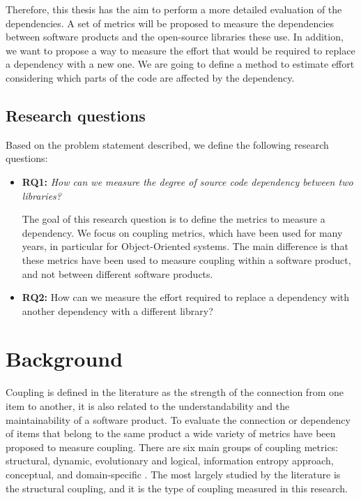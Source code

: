 \documentclass[a4paper]{article}
\begin{document}
Therefore, this thesis has the aim to perform a more detailed evaluation of the dependencies. A set of metrics will be proposed to measure the dependencies between software products and the open-source libraries these use. In addition, we want to propose a way to measure the effort that would be required to replace a dependency with a new one. We are going to define a method to estimate effort considering which parts of the code are affected by the dependency.

\subsection{Research questions}
Based on the problem statement described, we define the following research questions:

\begin{itemize}[noitemsep]
  \item \textbf{RQ1:} \textit{How can we measure the degree of source code dependency between two libraries?}

  The goal of this research question is to define the metrics to measure a dependency. We focus on coupling metrics, which have been used for many years, in particular for Object-Oriented systems. The main difference is that these metrics have been used to measure coupling within a software product, and not between different software products.

  \item \textbf{RQ2:} How can we measure the effort required to replace a dependency with another dependency with a different library?
\end{itemize}

\section{Background}\label{section:Background}
Coupling is defined in the literature as the strength of the connection from one item to another, it is also related to the understandability and the maintainability of a software product. To evaluate the connection or dependency of items that belong to the same product a wide variety of metrics have been proposed to measure coupling.
There are six main groups of coupling metrics: structural, dynamic, evolutionary and logical, information entropy approach, conceptual, and domain-specific  \cite{poshyvanyk2006conceptual}. The most largely studied by the literature is the structural coupling, and it is the type of coupling measured in this research.
\end{document}
